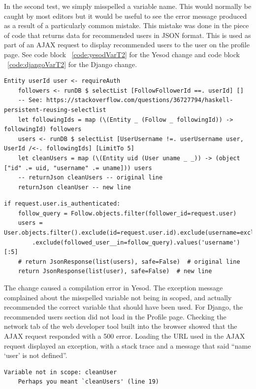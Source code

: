 In the second test, we simply misspelled a variable name. This would normally
be caught by most editors but it would be useful to see the error message produced
as a result of a particularly common mistake. This mistake was done in the piece
of code that returns data for recommended users in JSON format. This is used
as part of an AJAX request to display recommended users to the user on the
profile page. See code block ~\ref{code:yesodVarT2} for the Yesod change and
code block ~\ref{code:djangoVarT2} for the Django change.

\begin{lstlisting}[caption={Yesod Code Change},label={code:yesodVarT2}]
	Entity userId user <- requireAuth
	followers <- runDB $ selectList [FollowFollowerId ==. userId] []
	-- See: https://stackoverflow.com/questions/36727794/haskell-persistent-reusing-selectlist
	let followingIds = map (\(Entity _ (Follow _ followingId)) -> followingId) followers
	users <- runDB $ selectList [UserUsername !=. userUsername user, UserId /<-. followingIds] [LimitTo 5]
	let cleanUsers = map (\(Entity uid (User uname _ _)) -> (object ["id" .= uid, "username" .= uname])) users
	-- returnJson cleanUsers -- original line
	returnJson cleanUser -- new line
\end{lstlisting}

\begin{lstlisting}[caption={Django Code Change},label={code:djangoVarT2}]
	if request.user.is_authenticated:
	follow_query = Follow.objects.filter(follower_id=request.user)
	users = User.objects.filter().exclude(id=request.user.id).exclude(username=excluded_username)\
		.exclude(followed_user__in=follow_query).values('username')[:5]
	# return JsonResponse(list(users), safe=False)  # original line
	return JsonResponse(list(user), safe=False)  # new line
\end{lstlisting}

The change caused a compilation error in Yesod. The exception message complained
about the misspelled variable not being in scoped, and actually recommended the
correct variable that should have been used.
For Django, the recommended users section did not load in the Profile page.
Checking the network tab of the web developer tool built into the browser
showed that the AJAX request responded with a 500 error. Loading the URL used
in the AJAX request displayed an exception, with a stack trace and a message that said 
``name `user' is not defined''.

\begin{lstlisting}[caption={Yesod Exception Message},label={code:yesodT2E}]
	Variable not in scope: cleanUser
	Perhaps you meant `cleanUsers' (line 19)
\end{lstlisting}

